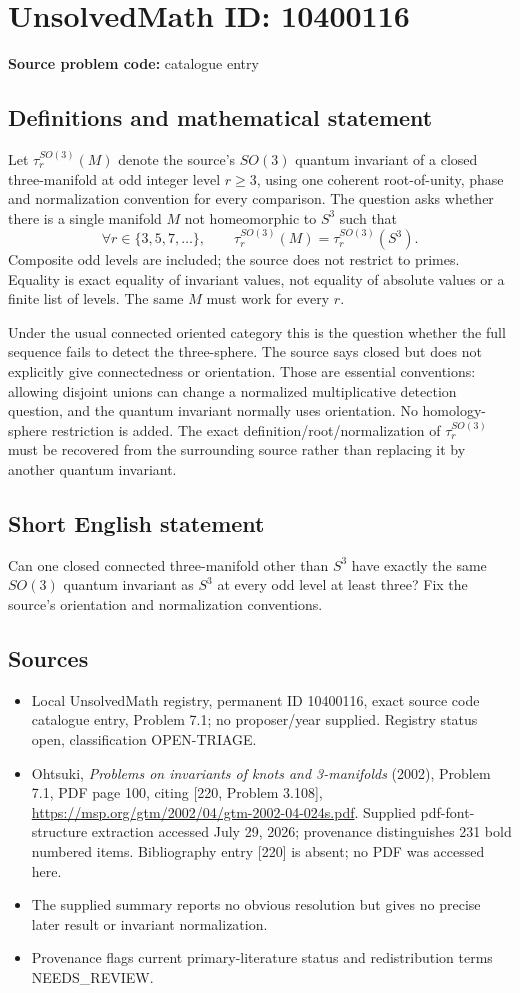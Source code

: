 \documentclass[11pt]{article}
\begin{document}
\section*{UnsolvedMath ID: 10400116}
\textbf{Source problem code:} catalogue entry
\subsection{Definitions and mathematical statement}
Let $\tau_r^{SO(3)}(M)$ denote the source's $SO(3)$ quantum invariant of a closed three-manifold at odd integer level $r\geq3$, using one coherent root-of-unity, phase and normalization convention for every comparison. The question asks whether there is a single manifold $M$ not homeomorphic to $S^3$ such that
\[
\forall r\in\{3,5,7,\ldots\},\qquad
\tau_r^{SO(3)}(M)=\tau_r^{SO(3)}(S^3).
\]
Composite odd levels are included; the source does not restrict to primes. Equality is exact equality of invariant values, not equality of absolute values or a finite list of levels. The same $M$ must work for every $r$.

Under the usual connected oriented category this is the question whether the full sequence fails to detect the three-sphere. The source says closed but does not explicitly give connectedness or orientation. Those are essential conventions: allowing disjoint unions can change a normalized multiplicative detection question, and the quantum invariant normally uses orientation. No homology-sphere restriction is added. The exact definition/root/normalization of $\tau_r^{SO(3)}$ must be recovered from the surrounding source rather than replacing it by another quantum invariant.
\subsection{Short English statement}
Can one closed connected three-manifold other than $S^3$ have exactly the same $SO(3)$ quantum invariant as $S^3$ at every odd level at least three? Fix the source's orientation and normalization conventions.
\subsection{Sources}
\begin{itemize}
\item Local UnsolvedMath registry, permanent ID 10400116, exact source code catalogue entry, Problem 7.1; no proposer/year supplied. Registry status open, classification OPEN-TRIAGE.
\item Ohtsuki, \emph{Problems on invariants of knots and 3-manifolds} (2002), Problem 7.1, PDF page 100, citing [220, Problem 3.108], \url{https://msp.org/gtm/2002/04/gtm-2002-04-024s.pdf}. Supplied pdf-font-structure extraction accessed July 29, 2026; provenance distinguishes 231 bold numbered items. Bibliography entry [220] is absent; no PDF was accessed here.
\item The supplied summary reports no obvious resolution but gives no precise later result or invariant normalization.
\item Provenance flags current primary-literature status and redistribution terms NEEDS\_REVIEW.
\end{itemize}
\end{document}
